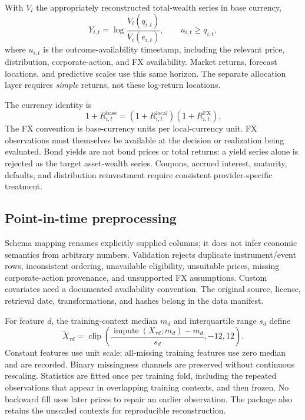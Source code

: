 \documentclass[11pt,a4paper]{article}
\newcommand{\clip}{\operatorname{clip}}
\begin{document}
With $V_i$ the appropriately reconstructed total-wealth series in base currency,
\begin{equation}
Y_{i,t}=\log\frac{V_i(q_{i,t})}{V_i(e_{i,t})},\qquad
u_{i,t}\ge q_{i,t},
\end{equation}
where $u_{i,t}$ is the outcome-availability timestamp, including the relevant price, distribution, corporate-action, and FX availability. Market returns, forecast locations, and predictive scales use this same horizon. The separate allocation layer requires \emph{simple} returns, not these log-return locations.

The currency identity is
\begin{equation}
1+R^{\mathrm{base}}_{i,t}=(1+R^{\mathrm{local}}_{i,t})(1+R^{\mathrm{FX}}_{i,t}).
\end{equation}
The FX convention is base-currency units per local-currency unit. FX observations must themselves be available at the decision or realization being evaluated. Bond yields are not bond prices or total returns: a yield series alone is rejected as the target asset-wealth series. Coupons, accrued interest, maturity, defaults, and distribution reinvestment require consistent provider-specific treatment.

\subsection{Point-in-time preprocessing}

Schema mapping renames explicitly supplied columns; it does not infer economic semantics from arbitrary numbers. Validation rejects duplicate instrument/event rows, inconsistent ordering, unavailable eligibility, unsuitable prices, missing corporate-action provenance, and unsupported FX assumptions. Custom covariates need a documented availability convention. The original source, license, retrieval date, transformations, and hashes belong in the data manifest.

For feature $d$, the training-context median $m_d$ and interquartile range $s_d$ define
\begin{equation}
\widetilde X_{\tau d}=\clip\!\left(\frac{\operatorname{impute}(X_{\tau d};m_d)-m_d}{s_d},-12,12\right).
\end{equation}
Constant features use unit scale; all-missing training features use zero median and are recorded. Binary missingness channels are preserved without continuous rescaling. Statistics are fitted once per training fold, including the repeated observations that appear in overlapping training contexts, and then frozen. No backward fill uses later prices to repair an earlier observation. The package also retains the unscaled contexts for reproducible reconstruction.
\end{document}
